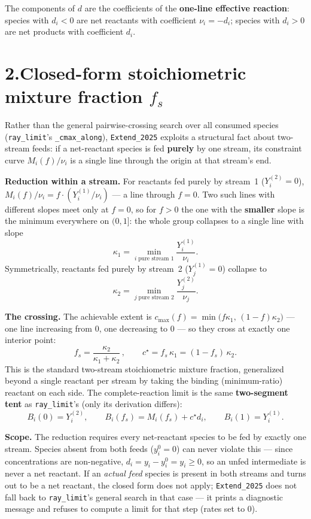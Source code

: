 \documentclass[11pt]{article}
\newcommand{\fs}{f_s}
\newcommand{\code}[1]{\texttt{\small #1}}
\begin{document}
The components of \(d\) are the coefficients of the \textbf{one-line effective
reaction}: species with \(d_i<0\) are net reactants with coefficient \(\nu_i=-d_i\);
species with \(d_i>0\) are net products with coefficient \(d_i\).

\section*{2.\quad Closed-form stoichiometric mixture fraction \(\fs\)}

Rather than the general pairwise-crossing search over all consumed species
(\texttt{ray\_limit}'s \code{\_cmax\_along}), \texttt{Extend\_2025} exploits a
structural fact about two-stream feeds: if a net-reactant species is fed
\textbf{purely} by one stream, its constraint curve \(M_i(f)/\nu_i\) is a single line
through the origin at that stream's end.

\textbf{Reduction within a stream.} For reactants fed purely by stream~1
(\(Y^{(2)}_i=0\)), \(M_i(f)/\nu_i = f\cdot(Y^{(1)}_i/\nu_i)\) --- a line through
\(f=0\). Two such lines with different slopes meet only at \(f=0\), so for \(f>0\) the
one with the \textbf{smaller} slope is the minimum everywhere on \((0,1]\): the whole
group collapses to a single line with slope
\[
\kappa_1 = \min_{i\;\text{pure stream 1}}\frac{Y^{(1)}_i}{\nu_i}.
\]
Symmetrically, reactants fed purely by stream~2 (\(Y^{(1)}_j=0\)) collapse to
\[
\kappa_2 = \min_{j\;\text{pure stream 2}}\frac{Y^{(2)}_j}{\nu_j}.
\]

\textbf{The crossing.} The achievable extent is
\(c_{\max}(f)=\min\bigl(f\kappa_1,\,(1-f)\kappa_2\bigr)\) --- one line increasing from
\(0\), one decreasing to \(0\) --- so they cross at exactly one interior point:
\[
\boxed{\fs = \frac{\kappa_2}{\kappa_1+\kappa_2}}\,,\qquad
c^{\star}=\fs\,\kappa_1=(1-\fs)\,\kappa_2.
\]
This is the standard two-stream stoichiometric mixture fraction, generalized beyond a
single reactant per stream by taking the binding (minimum-ratio) reactant on each side.
The complete-reaction limit is the same \textbf{two-segment tent} as
\texttt{ray\_limit}'s (only its derivation differs):
\[
B_i(0)=Y^{(2)}_i,\qquad B_i(\fs)=M_i(\fs)+c^{\star}d_i,\qquad B_i(1)=Y^{(1)}_i.
\]

\textbf{Scope.} The reduction requires every net-reactant species to be fed by exactly
one stream. Species absent from both feeds (\(y^0_i=0\)) can never violate this ---
since concentrations are non-negative, \(d_i=y_i-y^0_i=y_i\ge 0\), so an unfed
intermediate is never a net reactant. If an \emph{actual feed} species is present in
both streams and turns out to be a net reactant, the closed form does not apply;
\texttt{Extend\_2025} does not fall back to \texttt{ray\_limit}'s general search in that
case --- it prints a diagnostic message and refuses to compute a limit for that step
(rates set to \(0\)).
\end{document}
